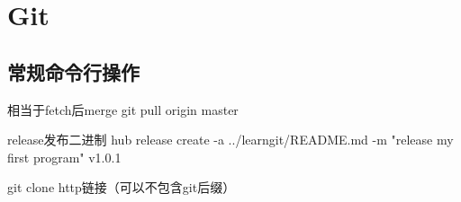 \chapter{Git}

\section{常规命令行操作}
相当于fetch后merge
git pull origin master

release发布二进制
hub release create -a ../learngit/README.md -m "release my first program" v1.0.1

git clone http链接（可以不包含git后缀）
